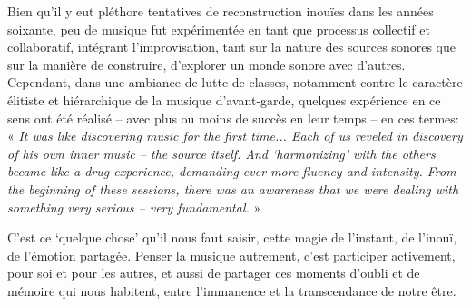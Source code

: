 \documentclass{article}
\begin{document}
Bien qu'il y eut pléthore tentatives de reconstruction inouïes dans les années soixante, peu de musique fut expérimentée en tant que processus collectif et collaboratif, intégrant l'improvisation, tant sur la nature des sources sonores que sur la manière de construire, d'explorer un monde sonore avec d'autres. Cependant, dans une ambiance de lutte de classes, notamment contre le caractère élitiste et hiérarchique de la musique d'avant-garde, 
quelques expérience en ce sens ont été réalisé -- avec plus ou moins de succès en leur temps -- en ces termes:
 « \textit{It was like discovering music for the first time... Each of us reveled in discovery of his own inner music -- the source itself. And `harmonizing' with the others became like a drug experience, demanding ever more fluency and intensity. From the beginning of these sessions, there was an awareness that we were dealing with something very serious – very fundamental.} »

C'est ce `quelque chose' qu'il nous faut saisir, cette magie de l'instant, de l'inouï, de l'émotion partagée. Penser la musique autrement, c'est participer activement, pour soi et pour les autres, et aussi de partager ces moments d'oubli et de mémoire qui nous habitent, entre l'immanence et la transcendance de notre être.



%
%
\end{document}
